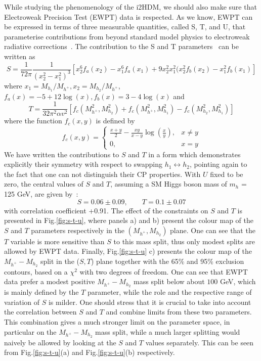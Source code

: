\documentclass[12pt,a4paper]{article}
\begin{document}
While studying the phenomenology of the i2HDM, we should also make sure that 
Electroweak Precision Test (EWPT) data is respected.
As we know, EWPT can be  expressed in terms of three measurable quantities, called S, T, and U, that parameterise contributions
from beyond standard model physics  to electroweak radiative corrections~\cite{PhysRevD.46.381}.
The contribution to the S and T parameters~\cite{Barbieri:2006dq} can be written as
\begin{equation}
S = 
\frac{1}{72\pi}\frac{1}{(x_2^2-x_1^2)^3}
\left[ 
x_2^6 f_a(x_2) -x_1^6 f_a(x_1)
+ 9 x_2^2 x_1^2( x_2^2 f_b(x_2) - x_1^2 f_b(x_1)
\right]
\end{equation}
where $x_1=M_{h_1}/M_{h^+}, x_2=M_{h_2}/M_{h^+}$, $f_a(x) = -5+12\log(x), f_b(x)=3-4\log(x)$
and
%
\begin{equation}
T = \frac{1}{32\pi^2\alpha v^2}\left[f_c(M_{h^{+}}^2,M_{h_2}^2) + f_c(M_{h^{+}}^2,M_{h_1}^2) - f_c(M_{h_2}^2,M_{h_1}^2)\right]
\end{equation}
where the function $f_c(x,y)$ is defined by
\begin{equation*}
f_c(x,y) = 
\begin{cases}
\frac{x+y}{2}-\frac{xy}{x-y}\log{\left(\frac{x}{y}\right)}, & x\neq y\\
0, & x = y
\end{cases}
\end{equation*}
We have written the contributions to $S$ and $T$ in a form which demonstrates explicitly their symmetry
with respect to swapping $h_1 \leftrightarrow h_2$, pointing again to the fact that one can not distinguish their CP properties.
With $U$ fixed to be zero, the central values of $S$ and $T$, assuming a SM Higgs boson mass of $m_h$ = 125 GeV, are given by~\cite{Baak:2014ora}:
\begin{equation}
S = 0.06 \pm 0.09 ,\qquad T = 0.1 \pm 0.07
\label{eq:ewpt}
\end{equation}
with correlation coefficient +0.91.
The effect of the constraints on $S$ and $T$ is presented in  Fig.\ref{fig:s-t-u}, where panels a) and b)  present the 
colour map of the $S$ and  $T$ parameters respectively 
in the $(M_{h^+},M_{h_2})$ plane.
One can see that the $T$ variable is more  sensitive than $S$
to this mass split, thus only modest splits
are allowed by EWPT data.
Finally, Fig.\ref{fig:s-t-u} c) presents  the colour map
of the $M_{h^+}-M_{h_2}$  split in the ($S,T$) plane together with the
65\% and 95\% exclusion contours, based on a $\chi^2$ with  two degrees of freedom.
  One can see that
EWPT data prefer a modest positive $M_{h^+}-M_{h_2}$ mass split 
 below  about $100$ GeV, which is mainly defined by the $T$ parameter, while the role and the respective range of variation of $S$ is milder. One should stress that 
 it is crucial to take into account the correlation between
$S$ and $T$ and  combine limits from these two  parameters. This combination gives a much stronger limit on the parameter 
space, in particular on the $M_{h^+}-M_{h_2}$ mass split, while a much larger splitting would
naively be allowed by looking at the $S$ and $T$ values separately. This can be
seen from  Fig.\ref{fig:s-t-u}(a) and Fig.\ref{fig:s-t-u}(b) respectively.
\end{document}
